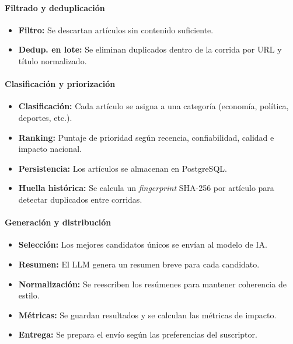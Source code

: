 \documentclass[12pt,oneside]{report}
\begin{document}
\paragraph{Filtrado y deduplicaci\'on}
\begin{itemize}[nosep]
    \item \textbf{Filtro:} Se descartan art\'iculos sin contenido suficiente.
    \item \textbf{Dedup. en lote:} Se eliminan duplicados dentro de la corrida por URL y t\'itulo normalizado.
\end{itemize}

\paragraph{Clasificaci\'on y priorizaci\'on}
\begin{itemize}[nosep]
    \item \textbf{Clasificaci\'on:} Cada art\'iculo se asigna a una categor\'ia (econom\'ia, pol\'itica, deportes, etc.).
    \item \textbf{Ranking:} Puntaje de prioridad seg\'un recencia, confiabilidad, calidad e impacto nacional.
    \item \textbf{Persistencia:} Los art\'iculos se almacenan en PostgreSQL.
    \item \textbf{Huella hist\'orica:} Se calcula un \textit{fingerprint} SHA-256 por art\'iculo para detectar duplicados entre corridas.
\end{itemize}

\paragraph{Generaci\'on y distribuci\'on}
\begin{itemize}[nosep]
    \item \textbf{Selecci\'on:} Los mejores candidatos \'unicos se env\'ian al modelo de IA.
    \item \textbf{Resumen:} El LLM genera un resumen breve para cada candidato.
    \item \textbf{Normalizaci\'on:} Se reescriben los res\'umenes para mantener coherencia de estilo.
    \item \textbf{M\'etricas:} Se guardan resultados y se calculan las m\'etricas de impacto.
    \item \textbf{Entrega:} Se prepara el env\'io seg\'un las preferencias del suscriptor.
\end{itemize}
\end{document}
